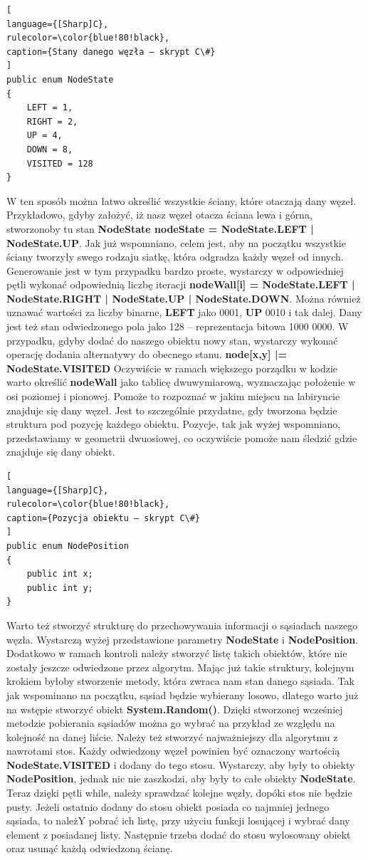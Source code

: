 \documentclass[oneside,polski,logo]{amuthesis}
\begin{document}
\begin{lstlisting}[
language={[Sharp]C},
rulecolor=\color{blue!80!black},
caption={Stany danego węzła – skrypt C\#}
]
public enum NodeState
{
    LEFT = 1,
    RIGHT = 2,
    UP = 4,
    DOWN = 8,
    VISITED = 128
}
\end{lstlisting}
W ten sposób można łatwo określić wszystkie ściany, które otaczają dany węzeł. Przykładowo, gdyby założyć, iż nasz węzeł otacza ściana lewa i górna, stworzonoby tu stan \textbf{NodeState nodeState = NodeState.LEFT | NodeState.UP}. Jak już wspomniano, celem jest, aby na początku wszystkie ściany tworzyły swego rodzaju siatkę, która odgradza każdy węzeł od innych. Generowanie jest w tym przypadku bardzo proste, wystarczy w odpowiedniej pętli wykonać odpowiednią liczbę iteracji \textbf{nodeWall[i] = NodeState.LEFT | NodeState.RIGHT | NodeState.UP | NodeState.DOWN}. Można również uznawać wartości za liczby binarne, \textbf{LEFT} jako 0001, \textbf{UP} 0010 i tak dalej. Dany jest też stan odwiedzonego pola jako 128 – reprezentacja bitowa 1000 0000. W przypadku, gdyby dodać do naszego obiektu nowy stan, wystarczy wykonać operację dodania alternatywy do obecnego stanu. \textbf{node[x,y] |= NodeState.VISITED} Oczywiście w ramach większego porządku w kodzie warto określić \textbf{nodeWall} jako tablicę dwuwymiarową, wyznaczając położenie w osi poziomej i pionowej. Pomoże to rozpoznać w jakim miejscu na labiryncie znajduje się dany węzeł. Jest to szczególnie przydatne, gdy tworzona będzie struktura pod pozycję każdego obiektu. Pozycje, tak jak wyżej wspomniano, przedstawiamy w geometrii dwuosiowej, co oczywiście pomoże nam śledzić gdzie znajduje się dany obiekt. 

\begin{lstlisting}[
language={[Sharp]C},
rulecolor=\color{blue!80!black},
caption={Pozycja obiektu – skrypt C\#}
]
public enum NodePosition
{
	public int x;
	public int y;
}
\end{lstlisting}
Warto też stworzyć strukturę do przechowywania informacji o sąsiadach naszego węzła. Wystarczą wyżej przedstawione parametry \textbf{NodeState} i \textbf{NodePosition}. Dodatkowo w ramach kontroli należy stworzyć listę takich obiektów, które nie zostały jeszcze odwiedzone przez algorytm. Mając już takie struktury, kolejnym krokiem byłoby stworzenie metody, która zwraca nam stan danego sąsiada. Tak jak wspominano na początku, sąsiad będzie wybierany losowo, dlatego warto już na wstępie stworzyć obiekt \textbf{System.Random()}. Dzięki stworzonej wcześniej metodzie pobierania sąsiadów można go wybrać na przykład ze względu na kolejność na danej liście. Należy też stworzyć najważniejszy dla algorytmu z nawrotami stos. Każdy odwiedzony węzeł powinien być oznaczony wartością \textbf{NodeState.VISITED} i dodany do tego stosu. Wystarczy, aby były to obiekty \textbf{NodePosition}, jednak nic nie zaszkodzi, aby były to całe obiekty \textbf{NodeState}. Teraz dzięki pętli while, należy sprawdzać kolejne węzły, dopóki stos nie będzie pusty. Jeżeli ostatnio dodany do stosu obiekt posiada co najmniej jednego sąsiada, to należY pobrać ich listę, przy użyciu funkcji losującej i wybrać dany element z posiadanej listy. Następnie trzeba dodać do stosu wylosowany obiekt oraz usunąć każdą odwiedzoną ścianę.
\end{document}
